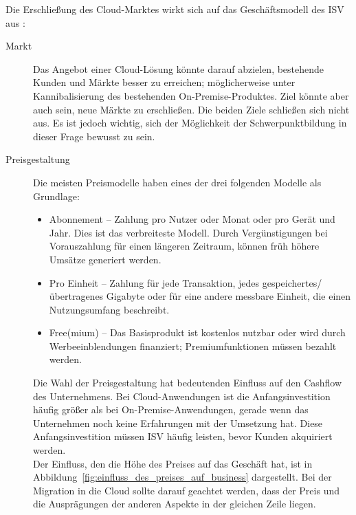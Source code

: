 Die Erschließung des Cloud-Marktes wirkt sich auf das Geschäftsmodell des ISV 
aus :
\begin{description}
	\item[Markt] Das Angebot einer Cloud-Lösung könnte darauf abzielen,
bestehende Kunden und Märkte besser zu erreichen; möglicherweise unter
Kannibalisierung des bestehenden On-Premise-Produktes. Ziel könnte aber auch
sein, neue Märkte zu erschließen. Die beiden Ziele schließen sich nicht aus. Es ist
jedoch wichtig, sich der Möglichkeit der Schwerpunktbildung in dieser Frage
bewusst zu sein.
	\item[Preisgestaltung] Die meisten Preismodelle haben eines der drei 
folgenden Modelle als Grundlage:
	\begin{itemize}
		\item Abonnement -- Zahlung pro Nutzer oder Monat oder pro Gerät und Jahr. Dies
ist das verbreiteste Modell. Durch Vergünstigungen bei Vorauszahlung für einen
längeren Zeitraum, können früh höhere Umsätze generiert werden.
		\item Pro Einheit -- Zahlung für jede Transaktion, jedes
gespeichertes/übertragenes Gigabyte oder für eine andere messbare Einheit, die
einen Nutzungsumfang beschreibt.
		\item Free(mium) -- Das Basisprodukt ist kostenlos nutzbar oder
wird durch Werbeeinblendungen finanziert; Premiumfunktionen müssen bezahlt
werden.
	\end{itemize}
	Die Wahl der Preisgestaltung hat bedeutenden Einfluss auf den Cashflow
des Unternehmens. Bei Cloud-Anwendungen ist die Anfangsinvestition häufig größer als bei On-Premise-Anwendungen,
gerade wenn das Unternehmen noch 
keine Erfahrungen mit der Umsetzung hat. Diese Anfangsinvestition müssen ISV 
häufig leisten, bevor Kunden akquiriert werden. \\
Der Einfluss, den die Höhe des Preises auf das Geschäft hat, ist in
Abbildung~\ref{fig:einfluss_des_preises_auf_business} dargestellt. Bei der
Migration in die Cloud sollte darauf geachtet werden, dass der Preis und die
Ausprägungen der anderen Aspekte in der gleichen Zeile liegen.

\end{description}
